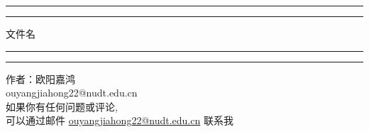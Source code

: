 \begin{titlepage}
	\centering %
	\scshape %
	\vspace*{1.5\baselineskip} %

	\rule{13cm}{1.6pt}\vspace*{-\baselineskip}\vspace*{2pt} %
	\rule{13cm}{0.4pt} %
	
		\vspace{0.75\baselineskip} %
	{	
        \Huge 
			文件名 \\	
    }
		\vspace{0.75\baselineskip} %
	\rule{13cm}{0.4pt}\vspace*{-\baselineskip}\vspace{3.2pt} %
	\rule{13cm}{1.6pt} %
	
		\vspace{1.75\baselineskip} %
	{\large 作者：欧阳嘉鸿\\
		\vspace*{1.2\baselineskip}
	ouyangjiahong22@nudt.edu.cn} \\
	\vfill
如果你有任何问题或评论, \\ \vspace{1mm} 可以通过邮件 \url{ouyangjiahong22@nudt.edu.cn} 联系我\\ \vspace{1mm}

\end{titlepage}